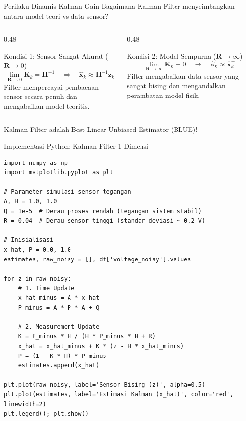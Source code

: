 \documentclass[aspectratio=169, 10pt]{beamer}
\begin{document}
\begin{frame}{Perilaku Dinamis Kalman Gain}
    Bagaimana Kalman Filter menyeimbangkan antara model teori vs data sensor?
    \begin{columns}[T]
        \begin{column}{0.48\textwidth}
            \begin{block}{Kondisi 1: Sensor Sangat Akurat ($\mathbf{R} \to 0$)}
                \begin{equation}
                    \lim_{\mathbf{R} \to 0} \mathbf{K}_k = \mathbf{H}^{-1} \quad \Longrightarrow \quad \hat{\mathbf{x}}_k \approx \mathbf{H}^{-1}\mathbf{z}_k
                \end{equation}
                Filter mempercayai pembacaan sensor secara penuh dan mengabaikan model teoritis.
            \end{block}
        \end{column}
        \begin{column}{0.48\textwidth}
            \begin{block}{Kondisi 2: Model Sempurna ($\mathbf{R} \to \infty$)}
                \begin{equation}
                    \lim_{\mathbf{R} \to \infty} \mathbf{K}_k = 0 \quad \Longrightarrow \quad \hat{\mathbf{x}}_k \approx \hat{\mathbf{x}}_k^-
                \end{equation}
                Filter mengabaikan data sensor yang sangat bising dan mengandalkan perambatan model fisik.
            \end{block}
        \end{column}
    \end{columns}
    \vspace{0.2cm}
    \begin{center}
        Kalman Filter adalah Best Linear Unbiased Estimator (BLUE)!
    \end{center}
\end{frame}

\begin{frame}[fragile]{Implementasi Python: Kalman Filter 1-Dimensi}
\begin{lstlisting}
import numpy as np
import matplotlib.pyplot as plt

# Parameter simulasi sensor tegangan
A, H = 1.0, 1.0
Q = 1e-5  # Derau proses rendah (tegangan sistem stabil)
R = 0.04  # Derau sensor tinggi (standar deviasi ~ 0.2 V)

# Inisialisasi
x_hat, P = 0.0, 1.0
estimates, raw_noisy = [], df['voltage_noisy'].values

for z in raw_noisy:
    # 1. Time Update
    x_hat_minus = A * x_hat
    P_minus = A * P * A + Q
    
    # 2. Measurement Update
    K = P_minus * H / (H * P_minus * H + R)
    x_hat = x_hat_minus + K * (z - H * x_hat_minus)
    P = (1 - K * H) * P_minus
    estimates.append(x_hat)

plt.plot(raw_noisy, label='Sensor Bising (z)', alpha=0.5)
plt.plot(estimates, label='Estimasi Kalman (x_hat)', color='red', linewidth=2)
plt.legend(); plt.show()
\end{lstlisting}
\end{frame}
\end{document}
